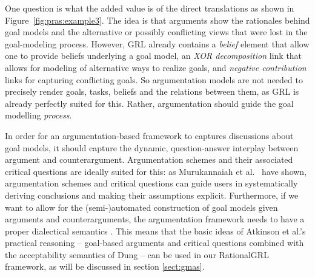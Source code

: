 One question is what the added value is of the direct translations as shown in Figure~\ref{fig:pras:example3}. The idea is that arguments show the rationales behind goal models and the alternative or possibly conflicting views that were lost in the goal-modeling process. However, GRL already contains a \emph{belief} element that allow one to provide beliefs underlying a goal model, an \emph{XOR decomposition} link that allows for modeling of alternative ways to realize goals, and \emph{negative contribution} links for capturing conflicting goals. So argumentation models are not needed to precisely render goals, tasks, beliefs and the relations between them, as GRL is already perfectly suited for this. Rather, argumentation should guide the goal modelling \emph{process}. 

In order for an argumentation-based framework to captures discussions about goal models, it should capture the dynamic, question-answer interplay between argument and counterargument. Argumentation schemes and their associated critical questions are ideally suited for this: as Murukannaiah et al.~\cite{murukannaiah2015} have shown, argumentation schemes and critical questions can guide users in systematically deriving conclusions and making their assumptions explicit. Furthermore, if we want to allow for the (semi-)automated construction of goal models given arguments and counterarguments, the argumentation framework needs to have a proper dialectical semantics \cite{Dung1995}. This means that the basic ideas of Atkinson et al.'s~\cite{atkinson2007} practical reasoning -- goal-based arguments and critical questions combined with the acceptability semantics of Dung -- can be used in our RationalGRL framework, as will be discussed in section \ref{sect:gmas}.
